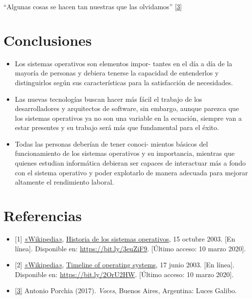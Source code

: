 \documentclass[12pt,spanish,Letterpaper,openany]{book}
\newcommand{\spaceminusmilis}{\vspace{-0.5mm}}
\begin{document}
\hypertarget{articulo03_cross03}{}

``Algunas cosas se hacen tan nuestras que las olvidamos'' \protect\hyperlink{articulo03_ref03}{{[}3{]}}

\spaceminusmilis

\hypertarget{conclusiones-2}{%
\section*{Conclusiones}\label{conclusiones-2}}

\begin{itemize}
\item
  Los sistemas operativos son elementos impor-
  tantes en el día a día de la mayoría de personas y debiera tenerse la capacidad de entenderlos y distinguirlos según sus características para la satisfacción de necesidades.
\item
  Las nuevas tecnologías buscan hacer más fácil el trabajo de los desarrolladores y arquitectos de software, sin embargo, aunque parezca que los sistemas operativos ya no son una variable en la ecuación, siempre van a estar presentes y su trabajo será más que fundamental para el éxito.
\item
  Todas las personas deberían de tener conoci-
  mientos básicos del funcionamiento de los sistemas operativos y su importancia, mientras que quienes estudian informática debieran ser capaces de interactuar más a fondo con el sistema operativo y poder explotarlo de manera adecuada para mejorar altamente el rendimiento laboral.
\end{itemize}

\spaceminusmilis

\hypertarget{referencias-2}{%
\section*{Referencias}\label{referencias-2}}

\begin{itemize}
\item
  \hypertarget{articulo03_ref01}{}

  {[}1{]} \href{https://es.wikipedia.org/}{«Wikipedia»}, \href{https://es.wikipedia.org/wiki/Historia_de_los_sistemas_operativos}{Historia de los sistemas operativos}, 15 octubre 2003. {[}En línea{]}. Disponible en: \url{https://bit.ly/3euZiF9}. {[}Último acceso: 10 marzo 2020{]}.
\item
  \hypertarget{articulo03_ref02}{}

  {[}2{]} \href{https://en.wikipedia.org/}{«Wikipedia»}, \href{https://en.wikipedia.org/wiki/Timeline_of_operating_systems}{Timeline of operating systems}, 17 junio 2003. {[}En línea{]}. Disponible en: \url{https://bit.ly/2OrU2HW}. {[}Último acceso: 10 marzo 2020{]}.
\item
  \hypertarget{articulo03_ref03}{}

  \protect\hyperlink{articulo03_cross03}{{[}3{]}} Antonio Porchia (2017). \emph{Voces}, Buenos Aires, Argentina: Luces Galibo.
\end{itemize}
\end{document}
